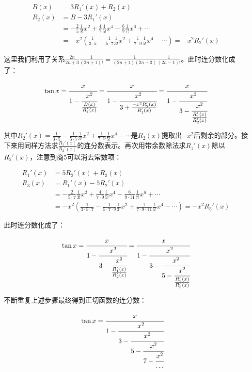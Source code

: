 \begin{align*}
B(x) &= 3R_1'(x) + R_2(x)  \\
R_2(x) &= B - 3R_1'(x) \\
   &= - \frac{2}{5}\frac{1}{3!}x^2 + \frac{4}{7}\frac{1}{5!}x^4 - \frac{6}{9}\frac{1}{7!}x^6 + \dotsb \\
   &= -x^2(\frac{1}{3 \cdot 5} - \frac{1}{5 \cdot 7}\frac{1}{3!}x^2 + \frac{1}{7 \cdot 9}\frac{1}{5!}x^4 - \dotsb) = -x^2 R_2'(x)
\end{align*}

这里我们利用了关系$\frac{2n}{2n+3}\frac{1}{(2n+1)!} = \frac{1}{(2n + 1)(2n + 3)}\frac{1}{(2n - 1)!}$。此时连分数化成了：

\[
\tan x = \cfrac{x}{1 - \cfrac{x^2}{\frac{B(x)}{R_1'(x)}}}
 = \cfrac{x}{1 - \cfrac{x^2}{3 + \frac{-x^2R_2'(x)}{R_1'(x)}}}
 =\cfrac{x}{1 - \cfrac{x^2}{3 - \cfrac{x^2}{\frac{R_1'(x)}{R_2'(x)}}}}
\]

其中$R_2'(x) = \frac{1}{3 \cdot 5} - \frac{1}{5 \cdot 7}\frac{1}{3!}x^2 + \frac{1}{7 \cdot 9}\frac{1}{5!}x^4 - \dotsb$是$R_2(x)$提取出$-x^2$后剩余的部分。接下来用同样方法求$\frac{R_1'(x)}{R_2'(x)}$的连分数表示。再次用带余数除法求$R_1'(x)$除以$R_2'(x)$，注意到商5可以消去常数项：

\begin{align*}
R_1'(x) &= 5R_2'(x) + R_3(x)  \\
R_3(x) &= R_1'(x) - 5R_2'(x) \\
   &= - \frac{2}{5 \cdot 7}\frac{1}{3!}x^2 + \frac{4}{7 \cdot 9}\frac{1}{5!}x^4 - \frac{6}{9 \cdot 11}\frac{1}{7!}x^6 + \dotsb \\
   &= -x^2(\frac{1}{3 \cdot 5 \cdot 7} - \frac{1}{5 \cdot 7 \cdot 9}\frac{1}{3!}x^2 + \frac{1}{7 \cdot 9 \cdot 11}\frac{1}{5!}x^4 - \dotsb) = -x^2 R_3'(x)
\end{align*}

此时连分数化成了：

\[
\tan x = \cfrac{x}{1 - \cfrac{x^2}{3 - \cfrac{x^2}{\frac{R_1'(x)}{R_2'(x)}}}} =
  \cfrac{x}{1 - \cfrac{x^2}{3 - \cfrac{x^2}{5 - \cfrac{x^2}{\frac{R_2'(x)}{R_3'(x)}}}}}
\]

不断重复上述步骤最终得到正切函数的连分数：

\begin{align*}
\tan x  &= \cfrac{x}{1 - \cfrac{x^2}{3 - \cfrac{x^2}{5 - \cfrac{x^2}{7 - \cfrac{x^2}{\dotso}}}}}
\end{align*}
